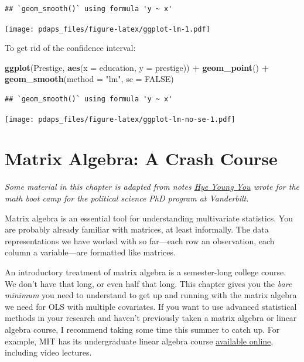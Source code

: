 \documentclass[12pt,oneside,openany]{book}
\newenvironment{Shaded}{\begin{snugshade}}{\end{snugshade}}
\newcommand{\KeywordTok}[1]{\textcolor[rgb]{0.13,0.29,0.53}{\textbf{#1}}}
\newcommand{\DataTypeTok}[1]{\textcolor[rgb]{0.13,0.29,0.53}{#1}}
\newcommand{\StringTok}[1]{\textcolor[rgb]{0.31,0.60,0.02}{#1}}
\newcommand{\OtherTok}[1]{\textcolor[rgb]{0.56,0.35,0.01}{#1}}
\newcommand{\OperatorTok}[1]{\textcolor[rgb]{0.81,0.36,0.00}{\textbf{#1}}}
\newcommand{\NormalTok}[1]{#1}
\begin{document}
\begin{verbatim}
## `geom_smooth()` using formula 'y ~ x'
\end{verbatim}

\texttt{[image: pdaps\_files/figure-latex/ggplot-lm-1.pdf]}

To get rid of the confidence interval:

\begin{Shaded}
\begin{Highlighting}[]
\KeywordTok{ggplot}\NormalTok{(Prestige, }\KeywordTok{aes}\NormalTok{(}\DataTypeTok{x =}\NormalTok{ education, }\DataTypeTok{y =}\NormalTok{ prestige)) }\OperatorTok{+}
\StringTok{  }\KeywordTok{geom_point}\NormalTok{() }\OperatorTok{+}
\StringTok{  }\KeywordTok{geom_smooth}\NormalTok{(}\DataTypeTok{method =} \StringTok{"lm"}\NormalTok{, }\DataTypeTok{se =} \OtherTok{FALSE}\NormalTok{)}
\end{Highlighting}
\end{Shaded}

\begin{verbatim}
## `geom_smooth()` using formula 'y ~ x'
\end{verbatim}

\texttt{[image: pdaps\_files/figure-latex/ggplot-lm-no-se-1.pdf]}

\chapter{Matrix Algebra: A Crash Course}\label{matrix}

\emph{Some material in this chapter is adapted from notes
\href{https://hyeyoungyou.com}{Hye Young You} wrote for the math boot
camp for the political science PhD program at Vanderbilt.}

Matrix algebra is an essential tool for understanding multivariate
statistics. You are probably already familiar with matrices, at least
informally. The data representations we have worked with so far---each
row an observation, each column a variable---are formatted like
matrices.

An introductory treatment of matrix algebra is a semester-long college
course. We don't have that long, or even half that long. This chapter
gives you the \emph{bare minimum} you need to understand to get up and
running with the matrix algebra we need for OLS with multiple
covariates. If you want to use advanced statistical methods in your
research and haven't previously taken a matrix algebra or linear algebra
course, I recommend taking some time this summer to catch up. For
example, MIT has its undergraduate linear algebra course
\href{https://ocw.mit.edu/courses/mathematics/18-06-linear-algebra-spring-2010/index.htm}{available
online}, including video lectures.
\end{document}
